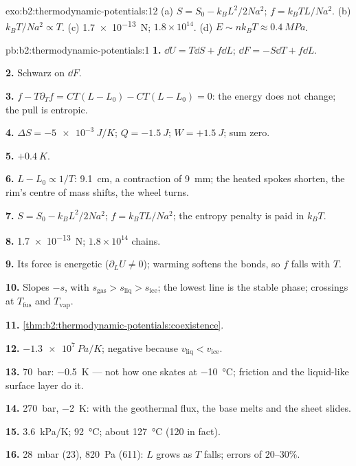 \begin{solution}{exo:b2:thermodynamic-potentials:12}
(a) $S = S_0 - k_BL^2/2Na^2$; $f = k_BTL/Na^2$. (b) $k_BT/Na^2 \propto T$. (c)
\qty{1.7e-13}{N}; $1.8 \times 10^{14}$. (d) $E \sim nk_BT \approx \qty{0.4}{MPa}$.
\end{solution}

\begin{solution}{pb:b2:thermodynamic-potentials:1}
\textbf{1.} $\dd U = T\dd S + f\dd L$; $\dd F = -S\dd T + f\dd L$.

\textbf{2.} Schwarz on $\dd F$.

\textbf{3.} $f - T\partial_Tf = CT(L - L_0) - CT(L - L_0) = 0$: the energy
does not change; the pull is entropic.

\textbf{4.} $\Delta S = \qty{-5e-3}{J/K}$; $Q = \qty{-1.5}{J}$; $W = +\qty{1.5}{J}$; sum
zero.

\textbf{5.} $+\qty{0.4}{K}$.

\textbf{6.} $L - L_0 \propto 1/T$: \qty{9.1}{cm}, a contraction of \qty{9}{mm}; the
heated spokes shorten, the rim's centre of mass shifts, the wheel
turns.

\textbf{7.} $S = S_0 - k_BL^2/2Na^2$; $f = k_BTL/Na^2$; the entropy penalty is
paid in $k_BT$.

\textbf{8.} \qty{1.7e-13}{N}; $1.8 \times 10^{14}$ chains.

\textbf{9.} Its force is energetic ($\partial_LU \ne 0$); warming softens
the bonds, so $f$ falls with $T$.

\textbf{10.} Slopes $-s$, with $s_{\text{gas}} > s_{\text{liq}} > s_{\text{ice}}$; the
lowest line is the stable phase; crossings at $T_{\text{fus}}$ and $T_{\text{vap}}$.

\textbf{11.} \cref{thm:b2:thermodynamic-potentials:coexistence}.

\textbf{12.} $\qty{-1.3e7}{Pa/K}$; negative because $v_{\text{liq}} < v_{\text{ice}}$.

\textbf{13.} \qty{70}{bar}: \qty{-0.5}{K} --- not how one skates at
\qty{-10}{\celsius}; friction and the liquid-like surface layer do it.

\textbf{14.} \qty{270}{bar}, \qty{-2}{K}: with the geothermal flux, the
base melts and the sheet slides.

\textbf{15.} \qty{3.6}{kPa/K}; \qty{92}{\celsius}; about \qty{127}{\celsius}
(\qty{120}{} in fact).

\textbf{16.} \qty{28}{mbar} (\qty{23}{}), \qty{820}{Pa} (\qty{611}{}): $L$ grows as $T$
falls; errors of $20$--$30\%$.


\end{solution}
